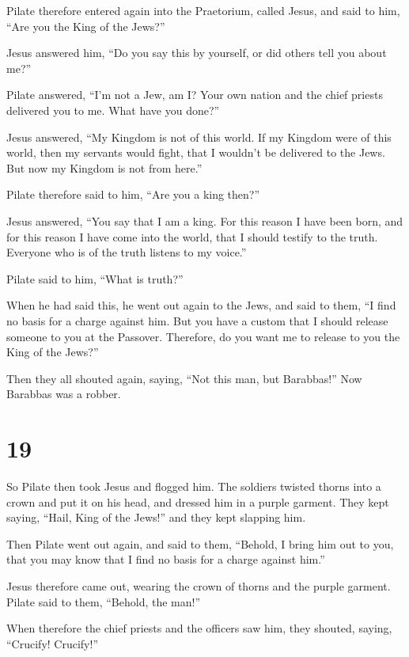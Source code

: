  Pilate therefore entered again into the Praetorium, called
Jesus, and said to him, ``Are you the King of the Jews?''

 Jesus answered him, ``Do you say this by yourself, or did
others tell you about me?''

 Pilate answered, ``I'm not a Jew, am I? Your own nation
and the chief priests delivered you to me. What have you done?''

 Jesus answered, ``My Kingdom is not of this world. If my
Kingdom were of this world, then my servants would fight, that I
wouldn't be delivered to the Jews. But now my Kingdom is not from
here.''

 Pilate therefore said to him, ``Are you a king then?''

Jesus answered, ``You say that I am a king. For this reason I have been
born, and for this reason I have come into the world, that I should
testify to the truth. Everyone who is of the truth listens to my
voice.''

 Pilate said to him, ``What is truth?''

When he had said this, he went out again to the Jews, and said to them,
``I find no basis for a charge against him.  But you have a
custom that I should release someone to you at the Passover. Therefore,
do you want me to release to you the King of the Jews?''

 Then they all shouted again, saying, ``Not this man, but
Barabbas!'' Now Barabbas was a robber.

\hypertarget{section-18}{%
\section{19}\label{section-18}}

 So Pilate then took Jesus and flogged him.  The
soldiers twisted thorns into a crown and put it on his head, and dressed
him in a purple garment.  They kept saying, ``Hail, King of
the Jews!'' and they kept slapping him.

 Then Pilate went out again, and said to them, ``Behold, I
bring him out to you, that you may know that I find no basis for a
charge against him.''

 Jesus therefore came out, wearing the crown of thorns and
the purple garment. Pilate said to them, ``Behold, the man!''

 When therefore the chief priests and the officers saw him,
they shouted, saying, ``Crucify! Crucify!''

